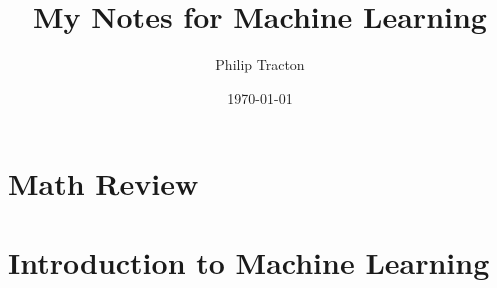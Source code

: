 \documentclass[12pt, svgnames, titlepage]{report}
\author{Philip Tracton}
\date{\today}
\date{}
\title{My Notes for Machine Learning}
\begin{document}
\maketitle
\newpage

\vspace{10mm}
\tableofcontents
\newpage

\chapter{Math Review}
\vspace{10mm}




\chapter{Introduction to Machine Learning}
\vspace{10mm}

\end{document}
